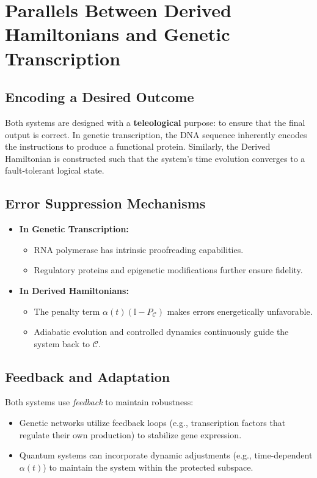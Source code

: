 \documentclass[11pt]{article}
\begin{document}
\section{Parallels Between Derived Hamiltonians and Genetic Transcription}
\subsection{Encoding a Desired Outcome}
Both systems are designed with a \textbf{teleological} purpose: to ensure that the final output is correct. In genetic transcription, the DNA sequence inherently encodes the instructions to produce a functional protein. Similarly, the Derived Hamiltonian is constructed such that the system’s time evolution converges to a fault-tolerant logical state.

\subsection{Error Suppression Mechanisms}
\begin{itemize}
    \item \textbf{In Genetic Transcription:} 
    \begin{itemize}
        \item RNA polymerase has intrinsic proofreading capabilities.
        \item Regulatory proteins and epigenetic modifications further ensure fidelity.
    \end{itemize}
    \item \textbf{In Derived Hamiltonians:}
    \begin{itemize}
        \item The penalty term $\alpha(t)(\mathbb{I}-P_{\mathcal{C}})$ makes errors energetically unfavorable.
        \item Adiabatic evolution and controlled dynamics continuously guide the system back to $\mathcal{C}$.
    \end{itemize}
\end{itemize}

\subsection{Feedback and Adaptation}
Both systems use \emph{feedback} to maintain robustness:
\begin{itemize}
    \item Genetic networks utilize feedback loops (e.g., transcription factors that regulate their own production) to stabilize gene expression.
    \item Quantum systems can incorporate dynamic adjustments (e.g., time-dependent $\alpha(t)$) to maintain the system within the protected subspace.
\end{itemize}
\end{document}
